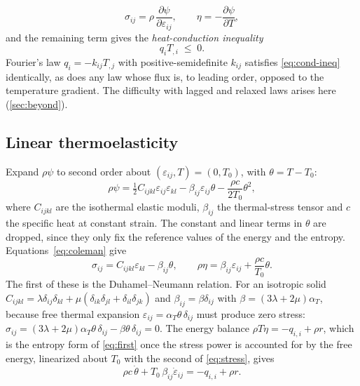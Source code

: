 \begin{equation}
\sigma_{ij}=\rho\,\frac{\partial\psi}{\partial\varepsilon_{ij}},\qquad \eta=-\frac{\partial\psi}{\partial T},\label{eq:coleman}
\end{equation}
and the remaining term gives the \emph{heat-conduction inequality}
\begin{equation}
q_iT_{,i}\;\le\;0.\label{eq:cond-ineq}
\end{equation}
Fourier's law $q_i=-k_{ij}T_{,j}$ with positive-semidefinite $k_{ij}$ satisfies \eqref{eq:cond-ineq} identically, as does any law whose flux is, to leading order, opposed to the temperature gradient. The difficulty with lagged and relaxed laws arises here (\cref{sec:beyond}).

\subsection{Linear thermoelasticity}
Expand $\rho\psi$ to second order about $(\varepsilon_{ij},T)=(0,T_0)$, with $\theta=T-T_0$:
\begin{equation}
\rho\psi=\tfrac12C_{ijkl}\varepsilon_{ij}\varepsilon_{kl}-\beta_{ij}\varepsilon_{ij}\theta-\frac{\rho c}{2T_0}\theta^2,\label{eq:psi}
\end{equation}
where $C_{ijkl}$ are the isothermal elastic moduli, $\beta_{ij}$ the thermal-stress tensor and $c$ the specific heat at constant strain. The constant and linear terms in $\theta$ are dropped, since they only fix the reference values of the energy and the entropy. Equations~\eqref{eq:coleman} give
\begin{equation}
\sigma_{ij}=C_{ijkl}\varepsilon_{kl}-\beta_{ij}\theta,\qquad \rho\eta=\beta_{ij}\varepsilon_{ij}+\frac{\rho c}{T_0}\theta.\label{eq:stress}
\end{equation}
The first of these is the Duhamel--Neumann relation. For an isotropic solid $C_{ijkl}=\lambda\delta_{ij}\delta_{kl}+\mu(\delta_{ik}\delta_{jl}+\delta_{il}\delta_{jk})$ and $\beta_{ij}=\beta\delta_{ij}$ with $\beta=(3\lambda+2\mu)\alpha_T$, because free thermal expansion $\varepsilon_{ij}=\alpha_T\theta\,\delta_{ij}$ must produce zero stress: $\sigma_{ij}=(3\lambda+2\mu)\alpha_T\theta\,\delta_{ij}-\beta\theta\,\delta_{ij}=0$. The energy balance $\rho T\dot\eta=-q_{i,i}+\rho r$, which is the entropy form of \eqref{eq:first} once the stress power is accounted for by the free energy, linearized about $T_0$ with the second of \eqref{eq:stress}, gives
\begin{equation}
\rho c\,\dot\theta+T_0\,\beta_{ij}\dot\varepsilon_{ij}=-q_{i,i}+\rho r. \label{eq:en}
\end{equation}
